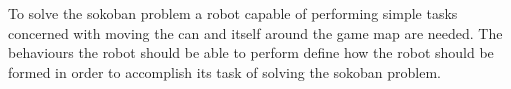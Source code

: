 To solve the sokoban problem a robot capable of performing simple tasks concerned with moving the can and itself around the game map are needed.
The behaviours the robot should be able to perform define how the robot should be formed in order to accomplish its task of solving the sokoban problem.
